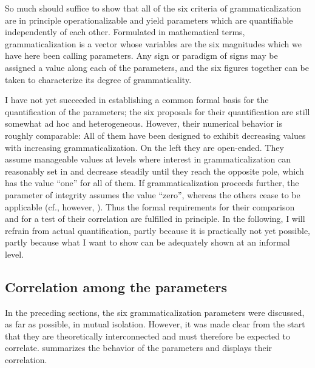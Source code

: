 So much should suffice to show that all of the six criteria of grammaticalization are in principle operationalizable and yield parameters which are quantifiable independently of each other. Formulated in mathematical terms, grammaticalization is a vector whose variables are the six magnitudes which we have here been calling parameters. Any sign or paradigm of signs may be assigned a value along each of the parameters, and the six figures together can be taken to characterize its degree of grammaticality.

I have not yet succeeded in establishing a common formal basis for the quantification of the parameters; the six proposals for their quantification are still somewhat ad hoc and heterogeneous. However, their numerical behavior is roughly comparable: All of them have been designed to exhibit decreasing values with increasing grammaticalization. On the left they are open-ended. They assume manageable values at levels where interest in grammaticalization can reasonably set in and decrease steadily until they reach the opposite pole, which has the value ``one'' for all of them. If grammaticalization proceeds further, the parameter of integrity assumes the value ``zero'', whereas the others cease to be applicable (cf., however, ). Thus the formal requirements for their comparison and for a test of their correlation are fulfilled in principle. In the following, I will refrain from actual quantification, partly because it is practically not yet possible, partly because what I want to show can be adequately shown at an informal level.

\subsection{Correlation among the parameters} \label{sec:4.4.2}

In the preceding sections, the six grammaticalization parameters were discussed, as far as possible, in mutual isolation. However, it was made clear from the start that they are theoretically interconnected and must therefore be expected to correlate.  summarizes the behavior of the parameters and displays their correlation.


